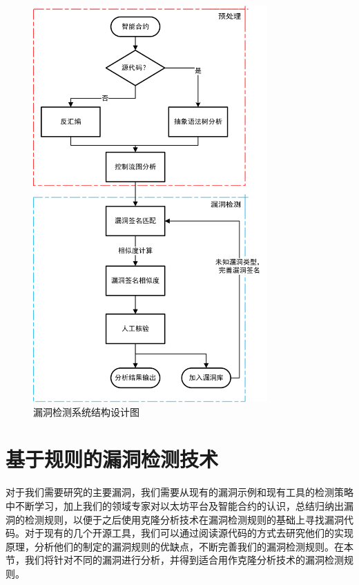 \begin{figure}[htb]
\vspace{+2mm}
  \centering
  \includegraphics[width=0.8\textwidth]{figures/system_diagram.png}
  \caption{漏洞检测系统结构设计图}
  \label{fig:system_diagram}
\vspace{-5mm}
\end{figure}

\section{基于规则的漏洞检测技术}\label{sec:detection_rules}

对于我们需要研究的主要漏洞，我们需要从现有的漏洞示例和现有工具的检测策略中不断学习，加上我们的领域专家对以太坊平台及智能合约的认识，总结归纳出漏洞的检测规则，以便于之后使用克隆分析技术在漏洞检测规则的基础上寻找漏洞代码。对于现有的几个开源工具，我们可以通过阅读源代码的方式去研究他们的实现原理，分析他们的制定的漏洞规则的优缺点，不断完善我们的漏洞检测规则。在本节，我们将针对不同的漏洞进行分析，并得到适合用作克隆分析技术的漏洞检测规则。

